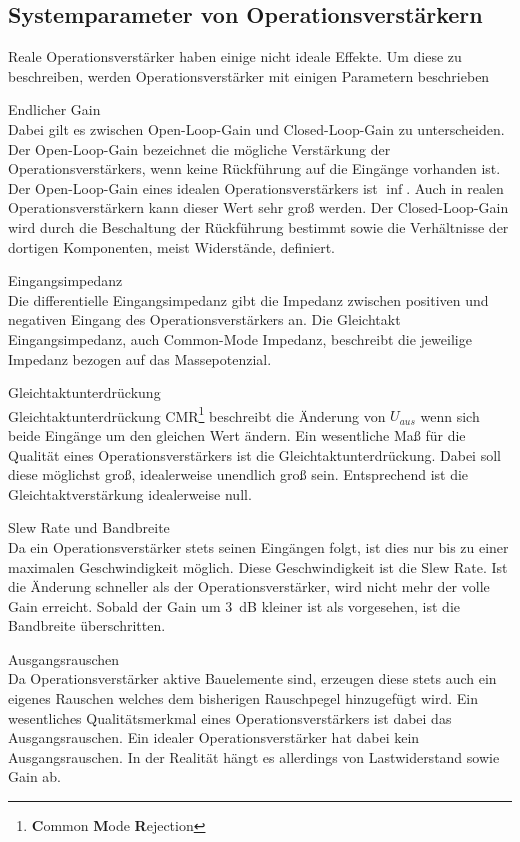 \subsection{Systemparameter von Operationsverstärkern}
Reale Operationsverstärker haben einige nicht ideale Effekte. Um diese zu beschreiben, werden Operationsverstärker mit einigen Parametern beschrieben
\begin{description}
\item Endlicher Gain \\
Dabei gilt es zwischen Open-Loop-Gain und Closed-Loop-Gain zu unterscheiden. Der Open-Loop-Gain bezeichnet die mögliche Verstärkung der Operationsverstärkers, wenn keine Rückführung auf die Eingänge vorhanden ist. Der Open-Loop-Gain eines idealen Operationsverstärkers ist $\inf$. Auch in realen Operationsverstärkern kann dieser Wert sehr groß werden. Der Closed-Loop-Gain wird durch die Beschaltung der Rückführung bestimmt sowie die Verhältnisse der dortigen Komponenten, meist Widerstände, definiert.
\item Eingangsimpedanz \\
Die differentielle Eingangsimpedanz gibt die Impedanz zwischen positiven und  negativen Eingang des Operationsverstärkers an. Die Gleichtakt Eingangsimpedanz, auch Common-Mode Impedanz, beschreibt die jeweilige Impedanz bezogen auf das Massepotenzial.
\item Gleichtaktunterdrückung \\
Gleichtaktunterdrückung CMR\footnote{ \textbf{C}ommon \textbf{M}ode \textbf{R}ejection} beschreibt die Änderung von $U_{aus}$ wenn sich beide Eingänge um den gleichen Wert ändern. Ein wesentliche Maß für die Qualität eines Operationsverstärkers ist die Gleichtaktunterdrückung. Dabei soll diese möglichst groß, idealerweise unendlich groß sein. Entsprechend ist die Gleichtaktverstärkung idealerweise null. 
\item Slew Rate und Bandbreite \\
Da ein Operationsverstärker stets seinen Eingängen folgt, ist dies nur bis zu einer maximalen Geschwindigkeit möglich. Diese Geschwindigkeit ist die Slew Rate. Ist die Änderung schneller als der Operationsverstärker, wird nicht mehr der volle Gain erreicht. Sobald der Gain um \SI{3}{dB} kleiner ist als vorgesehen, ist die Bandbreite überschritten.
\item Ausgangsrauschen\\
Da Operationsverstärker aktive Bauelemente sind, erzeugen diese stets auch ein eigenes Rauschen welches dem bisherigen Rauschpegel hinzugefügt wird. Ein wesentliches Qualitätsmerkmal eines Operationsverstärkers ist dabei das Ausgangsrauschen. Ein idealer Operationsverstärker hat dabei kein Ausgangsrauschen. In der Realität hängt es allerdings von Lastwiderstand sowie Gain ab. 

\end{description}
